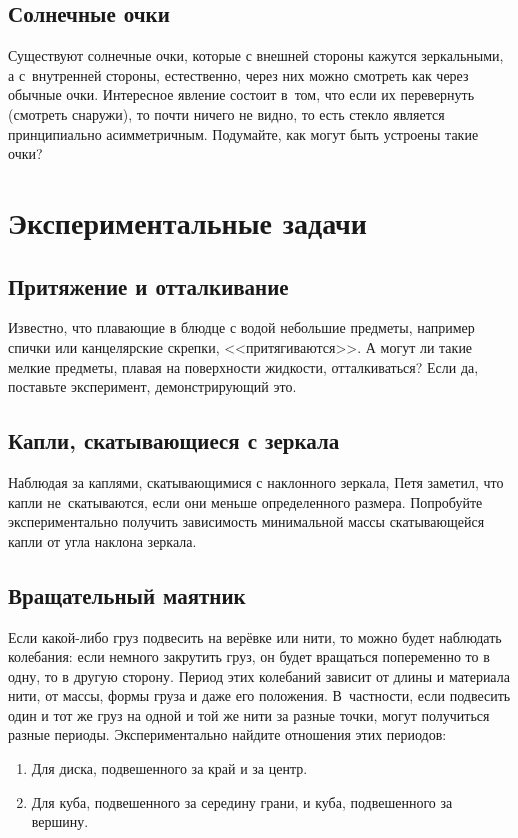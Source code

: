 \documentclass[a4paper,12pt]{article}
\begin{document}
\subsection{Солнечные очки}
Существуют солнечные очки, которые с внешней стороны кажутся зеркальными, а с~внутренней стороны,
естественно, через них можно смотреть как через обычные очки. Интересное явление состоит в~том,
что если их перевернуть (смотреть снаружи), то почти ничего не видно, то есть стекло является
принципиально асимметричным. Подумайте, как могут быть устроены такие очки?

\section{Экспериментальные задачи}

\subsection{Притяжение и отталкивание}

Известно, что плавающие в блюдце с водой небольшие предметы, например спички или канцелярские скрепки,
<<притягиваются>>. А могут ли такие мелкие предметы, плавая на поверхности жидкости,
отталкиваться? Если да, поставьте эксперимент, демонстрирующий это.

\subsection{Капли, скатывающиеся с зеркала}
Наблюдая за каплями, скатывающимися с наклонного зеркала, Петя заметил, что капли не~скатываются,
если они меньше определенного размера. Попробуйте экспериментально получить зависимость минимальной
массы скатывающейся капли от угла наклона зеркала.

\subsection{Вращательный маятник}
Если какой-либо груз подвесить на верёвке или нити, то можно будет наблюдать колебания:
если немного закрутить груз, он будет вращаться попеременно то в одну, то в другую сторону.
Период этих колебаний зависит от длины и материала нити, от массы, формы груза и даже его положения.
В~частности, если подвесить один и тот же груз на одной и той же нити за разные точки, могут
получиться разные периоды. Экспериментально найдите отношения этих периодов:
\begin{enumerate}
\item Для диска, подвешенного за край и за центр.
\item Для куба, подвешенного за середину грани, и куба, подвешенного за вершину.
\end{enumerate}
\end{document}
